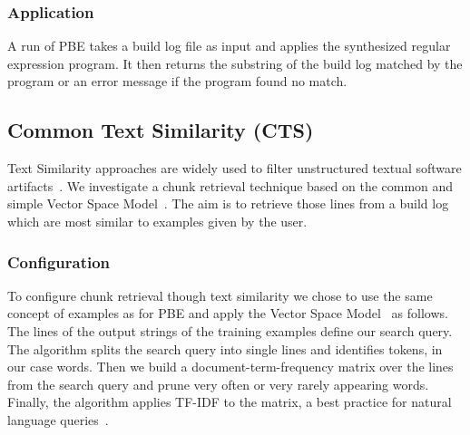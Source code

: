 \subsubsection{Application}
A run of PBE takes a build log file as input and applies the
synthesized regular expression program.
It then returns the substring
of the build log matched by the program or an error message if the
program found no match.


\subsection{Common Text Similarity (CTS)}
\label{sec:expl-ts}
Text Similarity approaches are widely used to filter unstructured
textual software artifacts~\cite{runeson2007detection,
marcus2005recovery,antoniol2002recovering,mccarey2006recommending}.
We investigate a chunk retrieval technique based on the common
and simple Vector Space Model~\cite{schutze2008introduction}.
The aim is to retrieve those lines from a build log which are most
similar to examples given by the user.

\subsubsection{Configuration}
To configure chunk retrieval though text similarity we chose to use
the same concept of examples as for PBE
and apply the Vector Space Model~\cite{schutze2008introduction}
as follows.
The
lines of the output strings of the training examples define our search
query.
The algorithm splits the search query into single lines and
identifies tokens, in our case words.
Then we build a
document-term-frequency matrix over the lines from the search query
and prune very often or very rarely appearing words.
Finally, the
algorithm applies TF-IDF to the matrix, a best practice for natural
language queries~\cite{lee1997document}.

